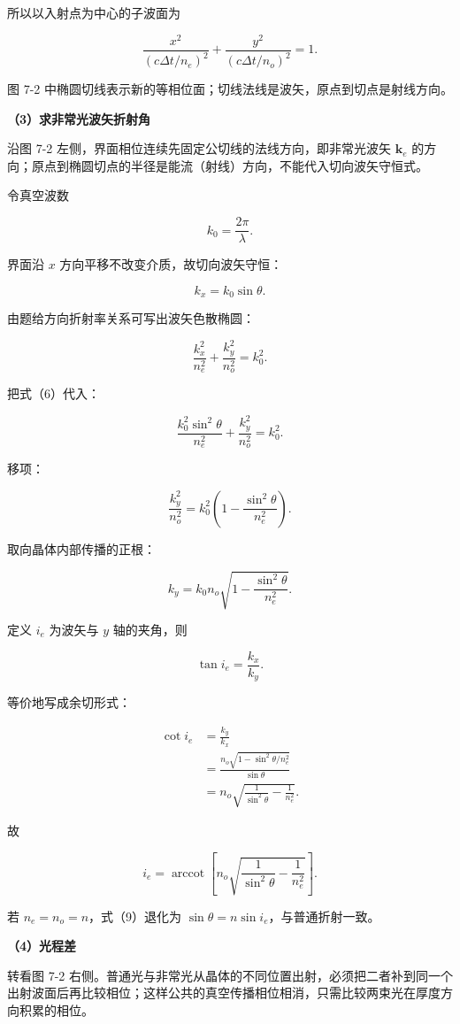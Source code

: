 \documentclass[12pt,a4paper,UTF8]{ctexart}
\begin{document}
所以以入射点为中心的子波面为

\[\boxed{
\frac{x^2}{(c\Delta t/n_e)^2}
+\frac{y^2}{(c\Delta t/n_o)^2}=1}.\]

图 7-2
中椭圆切线表示新的等相位面；切线法线是波矢，原点到切点是射线方向。

\textbf{（3）求非常光波矢折射角}

沿图 7-2 左侧，界面相位连续先固定公切线的法线方向，即非常光波矢
\(\bm k_e\)
的方向；原点到椭圆切点的半径是能流（射线）方向，不能代入切向波矢守恒式。

令真空波数

\[k_0=\frac{2\pi}{\lambda}.\]

界面沿 \(x\) 方向平移不改变介质，故切向波矢守恒：

\[k_x=k_0\sin\theta.\]

由题给方向折射率关系可写出波矢色散椭圆：

\[\frac{k_x^2}{n_e^2}+\frac{k_y^2}{n_o^2}=k_0^2.\]

把式（6）代入：

\[\frac{k_0^2\sin^2\theta}{n_e^2}
+\frac{k_y^2}{n_o^2}=k_0^2.\]

移项：

\[\frac{k_y^2}{n_o^2}
=k_0^2\left(1-\frac{\sin^2\theta}{n_e^2}\right).\]

取向晶体内部传播的正根：

\[k_y=k_0n_o\sqrt{1-\frac{\sin^2\theta}{n_e^2}}.\]

定义 \(i_e\) 为波矢与 \(y\) 轴的夹角，则

\[\tan i_e=\frac{k_x}{k_y}.\]

等价地写成余切形式：

\[\begin{aligned}
\cot i_e
&=\frac{k_y}{k_x}\\
&=\frac{n_o\sqrt{1-\sin^2\theta/n_e^2}}{\sin\theta}\\
&=n_o\sqrt{\frac1{\sin^2\theta}-\frac1{n_e^2}}.
\end{aligned}\]

故

\[\boxed{
i_e=\operatorname{arccot}\left[
n_o\sqrt{\frac1{\sin^2\theta}-\frac1{n_e^2}}
\right]}.\]

若 \(n_e=n_o=n\)，式（9）退化为
\(\sin\theta=n\sin i_e\)，与普通折射一致。

\textbf{（4）光程差}

转看图 7-2
右侧。普通光与非常光从晶体的不同位置出射，必须把二者补到同一个出射波面后再比较相位；这样公共的真空传播相位相消，只需比较两束光在厚度方向积累的相位。
\end{document}
